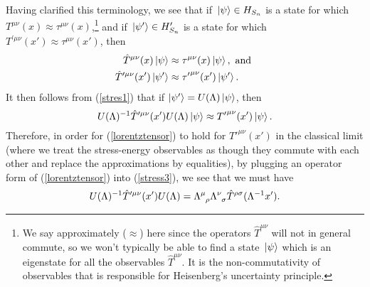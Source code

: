 Having clarified this terminology, we see that if $\ket*{\psi}\in H_{S_n}$ is a state for which $T^{\mu\nu}(x)\approx \tau^{\mu\nu}(x)$,\footnote{We say approximately ($\approx$) here since the operators $\hat{T}^{\mu\nu}$ will not in general commute, so we won't typically be able to find a state $\ket*{\psi}$ which is an eigenstate for all the observables $\hat{T}^{\mu\nu}$. It is the non-commutativity of observables that is responsible for Heisenberg's uncertainty principle.} and if $\ket*{\psi'}\in H_{S_n}'$ is a state for which $T^{\prime\mu\nu}(x')\approx \tau^{\mu\nu}(x')$, then
\begin{subequations}
\begin{align}
\hat{T}^{\mu\nu}(x)\ket{\psi}&\approx\tau^{\mu\nu}(x)\ket{\psi}, \text{ and }\label{stres1}\\ 
\hat{T}^{\prime\mu\nu}(x')\ket{\psi'}&\approx{\tau'}^{\mu\nu}(x')\ket{\psi'}.\label{stres1}
\end{align}
\end{subequations}
It then follows from (\ref{stres1}) that if $\ket{\psi'}=U(\Lambda)\ket{\psi}$, then
\begin{equation}\label{stress3}
    U(\Lambda)^{-1}\hat{T}^{\prime\mu\nu}(x')U(\Lambda)\ket{\psi}\approx{T'}^{\mu\nu}(x')\ket{\psi}.
\end{equation}
Therefore, in order for (\ref{lorentztensor}) to hold for ${T'}^{\mu\nu}(x')$ in the classical limit (where we treat the stress-energy observables as though they commute with each other and replace the approximations by equalities), by plugging an operator form of  (\ref{lorentztensor}) into (\ref{stress3}), we see that we must have
\begin{equation}\label{TUrelation}
U(\Lambda)^{-1}\hat{T}^{\prime\mu\nu}(x')U(\Lambda)=\Lambda\indices{^\mu_\rho}\Lambda\indices{^\nu_\sigma}\hat{T}^{\rho\sigma}(\Lambda^{-1}x').
\end{equation}



